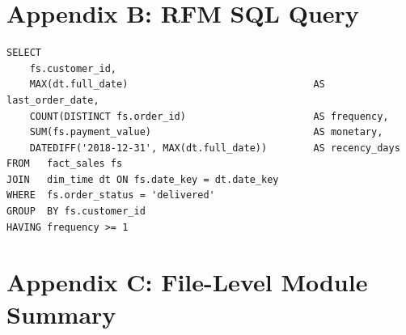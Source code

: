 \documentclass[12pt,a4paper]{report}
\begin{document}
\chapter*{Appendix B: RFM SQL Query}

\begin{lstlisting}[style=sqlcode, caption={RFM feature extraction query}]
SELECT
    fs.customer_id,
    MAX(dt.full_date)                                AS last_order_date,
    COUNT(DISTINCT fs.order_id)                      AS frequency,
    SUM(fs.payment_value)                            AS monetary,
    DATEDIFF('2018-12-31', MAX(dt.full_date))        AS recency_days
FROM   fact_sales fs
JOIN   dim_time dt ON fs.date_key = dt.date_key
WHERE  fs.order_status = 'delivered'
GROUP  BY fs.customer_id
HAVING frequency >= 1
\end{lstlisting}

\chapter*{Appendix C: File-Level Module Summary}
\end{document}
